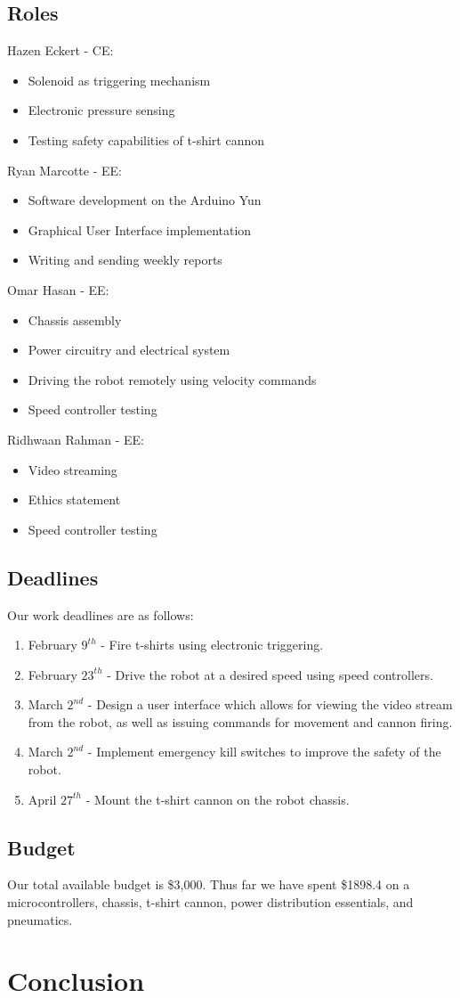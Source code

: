 \documentclass[letterpaper,12pt]{article}
\begin{document}
\subsection{Roles}
Hazen Eckert - CE:
\begin{itemize}
\item Solenoid as triggering  mechanism
\item Electronic pressure sensing 
\item Testing safety capabilities of t-shirt cannon
\end{itemize}
Ryan Marcotte - EE:
\begin{itemize}
\item Software development on the Arduino Yun
\item Graphical User Interface implementation
\item Writing and sending weekly reports
\end{itemize}


Omar Hasan - EE:
\begin{itemize}
\item Chassis assembly
\item Power circuitry and electrical system
\item Driving the robot remotely using velocity commands
\item Speed controller testing
\end{itemize}
Ridhwaan Rahman - EE:
\begin{itemize}
\item Video streaming
\item Ethics statement
\item Speed controller testing
\end{itemize}
\subsection{Deadlines}
Our work deadlines are as follows:
\begin{enumerate}
\item February $9^{th}$ - Fire t-shirts using electronic triggering.
\item February $23^{th}$ - Drive the robot at a desired speed using speed controllers.
\item March $2^{nd}$ - Design a user interface which allows for viewing the video stream from the robot, as well as issuing commands for movement and cannon firing.
\item March $2^{nd}$ - Implement emergency kill switches to improve the safety of the robot.
\item April $27^{th}$ - Mount the t-shirt cannon on the robot chassis.
\end{enumerate}
\subsection{Budget}
Our total available budget is \$3,000. Thus far we have spent \$1898.4 on a microcontrollers,
chassis, t-shirt cannon, power distribution essentials, and pneumatics.
\section{Conclusion}
\end{document}
